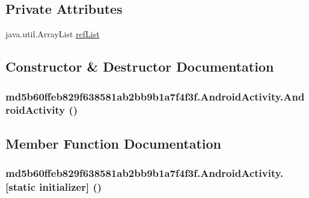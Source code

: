 \subsection*{Private Attributes}
\begin{CompactItemize}
\item 
java.util.ArrayList \hyperlink{classmd5b60ffeb829f638581ab2bb9b1a7f4f3f_1_1_android_activity_5c1d60bfbc05ceae734119d4d979b8cc}{refList}
\end{CompactItemize}


\subsection{Constructor \& Destructor Documentation}
\hypertarget{classmd5b60ffeb829f638581ab2bb9b1a7f4f3f_1_1_android_activity_d1caa81ed50416868d2c814badd75255}{
\subsubsection[{AndroidActivity}]{\setlength{\rightskip}{0pt plus 5cm}md5b60ffeb829f638581ab2bb9b1a7f4f3f.AndroidActivity.AndroidActivity ()}}
\label{classmd5b60ffeb829f638581ab2bb9b1a7f4f3f_1_1_android_activity_d1caa81ed50416868d2c814badd75255}




\subsection{Member Function Documentation}
\hypertarget{classmd5b60ffeb829f638581ab2bb9b1a7f4f3f_1_1_android_activity_ce19d2cda349014c97ed5589f26495f0}{
\subsubsection[{[static initializer]}]{\setlength{\rightskip}{0pt plus 5cm}md5b60ffeb829f638581ab2bb9b1a7f4f3f.AndroidActivity.\mbox{[}static initializer\mbox{]} ()}}
\label{classmd5b60ffeb829f638581ab2bb9b1a7f4f3f_1_1_android_activity_ce19d2cda349014c97ed5589f26495f0}




